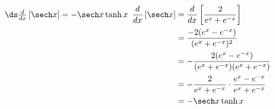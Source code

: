 {$\ds\frac{d}{dx}\left[\sech x\right] = -\sech x\tanh x$}
{\hfill$\begin{aligned}[t]
		\frac{d}{dx}\left[\sech x\right] &= \frac{d}{dx}\left[\frac{2}{e^x+e^{-x}}\right]  \\
											&= \frac{-2(e^x-e^{-x})}{(e^x+e^{-x})^2} \\
											&= -\frac{2(e^x-e^{-x})}{(e^x+e^{-x})(e^x+e^{-x})} \\
											&= -\frac{2}{e^x+e^{-x}}\cdot \frac{e^x-e^{-x}}{e^x+e^{-x}}\\
											&= -\sech x\tanh x
\end{aligned}$\hfill\null}
